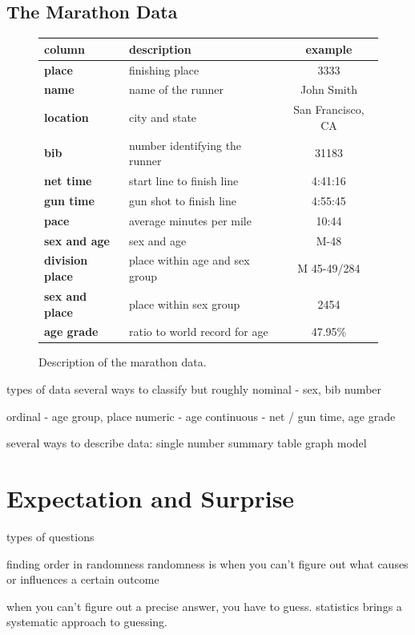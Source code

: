 \documentclass{tufte-book} %
\begin{document}
\section{The Marathon Data}
\begin{figure}
	\centering
	\begin{tabular} { l | l | c }
		\textbf{column} & \textbf{description} & \textbf{example} \\ \hline
		\textbf{place} & finishing place & 3333\\ 
		\textbf{name} & name of the runner & John Smith \\ 
		\textbf{location} & city and state & San Francisco, CA \\ 
		\textbf{bib} & number identifying the runner & 31183 \\ 
		\textbf{net time} & start line to finish line & 4:41:16 \\ 
		\textbf{gun time} & gun shot to finish line & 4:55:45 \\ 
		\textbf{pace} & average minutes per mile & 10:44 \\
		\textbf{sex and age} & sex and age & M-48\\ 
		\textbf{division place} & place within age and sex group & M 45-49/284 \\ 
		\textbf{sex and place} & place within sex group & 2454 \\ 
		\textbf{age grade} & ratio to world record for age & 47.95\% \\
	\end{tabular}
	\label{tab:marathon-data}
	\caption{Description of the marathon data.}
\end{figure}


types of data
several ways to classify but roughly
nominal - sex, bib number

ordinal - age group, place
numeric - age
continuous - net / gun time, age grade

several ways to describe data:
single number
summary table
graph
model

\chapter{Expectation and Surprise}
\label{ch:expectation-surprise}
types of questions

finding order in randomness
randomness is when you can't figure out what causes or influences a certain outcome

when you can't figure out a precise answer, you have to guess. statistics brings a 
systematic approach to guessing. 
\end{document}
